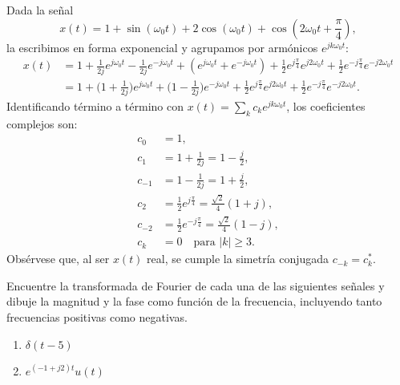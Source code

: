 \documentclass[
  11pt,
  letterpaper,
   addpoints,
   answers
  ]{exam}
\begin{document}
\begin{questions}
\begin{solution}
Dada la señal
\begin{equation}
x(t)=1+\sin(\omega_0 t)+2\cos(\omega_0 t)+\cos\!\left(2\omega_0 t+\frac{\pi}{4}\right),
\end{equation}
la escribimos en forma exponencial y agrupamos por armónicos \(e^{jk\omega_0 t}\):
\begin{align}
x(t)
&= 1
+ \frac{1}{2j}e^{j\omega_0 t}-\frac{1}{2j}e^{-j\omega_0 t}
+ \left(e^{j\omega_0 t}+e^{-j\omega_0 t}\right)
+ \frac{1}{2}e^{j\frac{\pi}{4}}e^{j2\omega_0 t}
+ \frac{1}{2}e^{-j\frac{\pi}{4}}e^{-j2\omega_0 t} \\
&= 1
+ \Big(1+\tfrac{1}{2j}\Big)e^{j\omega_0 t}
+ \Big(1-\tfrac{1}{2j}\Big)e^{-j\omega_0 t}
+ \frac{1}{2}e^{j\frac{\pi}{4}}e^{j2\omega_0 t}
+ \frac{1}{2}e^{-j\frac{\pi}{4}}e^{-j2\omega_0 t}.
\end{align}
Identificando término a término con \(x(t)=\sum_k c_k e^{jk\omega_0 t}\), los coeficientes complejos son:
\begin{align}
c_0 &= 1, \\
c_{1} &= 1+\frac{1}{2j}=1-\frac{j}{2}, \\
c_{-1} &= 1-\frac{1}{2j}=1+\frac{j}{2}, \\
c_{2} &= \frac{1}{2}e^{j\frac{\pi}{4}}=\frac{\sqrt{2}}{4}(1+j), \\
c_{-2} &= \frac{1}{2}e^{-j\frac{\pi}{4}}=\frac{\sqrt{2}}{4}(1-j), \\
c_k &= 0 \quad \text{para } |k|\ge 3.
\end{align}
Obsérvese que, al ser \(x(t)\) real, se cumple la simetría conjugada \(c_{-k}=c_k^{*}\).


\end{solution}
\question Encuentre la transformada de Fourier de cada una de las siguientes señales y dibuje la magnitud y la fase como función de la frecuencia, incluyendo tanto frecuencias positivas como negativas.

\begin{enumerate}
    \item $\delta(t - 5)$
    \item $e^{(-1+j2)t}u(t)$
\end{enumerate}
\begin{solution}

\end{solution}
\end{questions}
\end{document}
